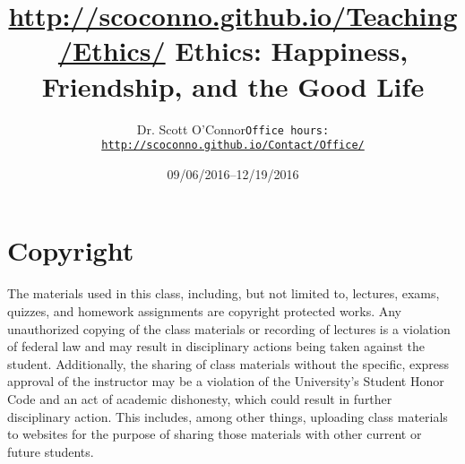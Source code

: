 \documentclass[article,oneside]{memoir}
\def\myauthor{Author}
\def\mytitle{Title}
\def\mycopyright{\myauthor}
\def\myweb{\href{http://scoconno.github.io/Teaching/Ethics/}{http://scoconno.github.io/Teaching/Ethics/}}
\def\myauthor{Dr. Scott O'Connor}
\def\mytitle{{\normalsize \myweb \newline} \HUGE Ethics: Happiness, Friendship, and the Good Life}
\begin{document}
\setsansfont[Mapping=tex-text]{Myriad Pro} 
\setmonofont[Mapping=tex-text,Scale=0.8]{Georgia} 

\def\ind{\hangindent=1 true cm\hangafter=1 \noindent}
\def\labelitemi{$\cdot$}


\title{\LARGE \mytitle}     
\author{\Large\myauthor \newline \footnotesize\texttt{\noindent Office hours: \href{http://scoconno.github.io/Contact/Office/}{http://scoconno.github.io/Contact/Office/}}}
\date{09/06/2016--12/19/2016}


\maketitle




%
%

\section{Copyright}
The materials used in this class, including, but not limited to, lectures, exams, quizzes, and homework assignments are copyright protected works.  Any unauthorized copying of the class materials or recording of lectures is a violation of federal law and may result in disciplinary actions being taken against the student.  Additionally, the sharing of class materials without the specific, express approval of the instructor may be a violation of the University's Student Honor Code and an act of academic dishonesty, which could result in further disciplinary action.  This includes, among other things, uploading class materials to websites for the purpose of sharing those materials with other current or future students. 
\end{document}
